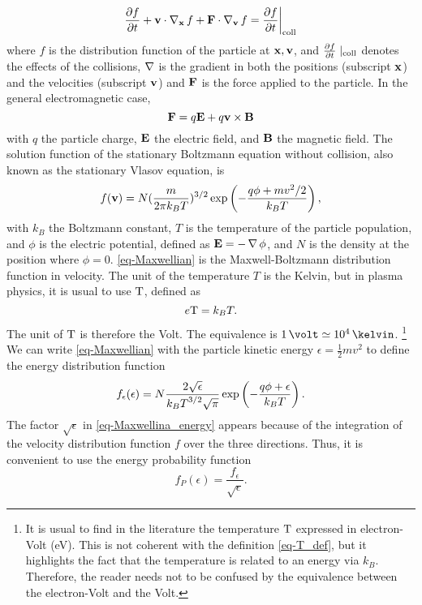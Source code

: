 \begin{equation} \label{eq-boltzmann}
\frac{\partial f}{\partial t}  + {\mathbf v} \cdot \operatorname{{\mathbf \nabla}}_{{\mathbf x}} f + {\mathbf F} \cdot  \operatorname{{\mathbf \nabla}}_{{\mathbf v}} f = \frac{\partial f}{\partial t}  \bigg\vert_{\rm coll} 
\end{equation}
where $f$ is the distribution function of the particle at ${\mathbf x}, {\mathbf v}$, and $\frac{\partial f}{\partial t}\mid_{\rm coll}$ denotes the effects of the collisions, $\operatorname{{\mathbf \nabla}}$ is the gradient in both the positions (subscript ${\mathbf x}$) and the velocities (subscript ${\mathbf v}$)  and ${\mathbf F}$ is the force applied to the particle.
In the general electromagnetic case,
\begin{equation*} \label{eq-forceEM}
  {\mathbf F} =  q {\mathbf E} + q {\mathbf v} \times {\mathbf B}
\end{equation*}
with $q$ the particle charge, ${\mathbf E}$ the electric field, and ${\mathbf B}$ the magnetic field.
The solution function of the stationary Boltzmann equation without collision, also known as the stationary Vlasov equation, is
\begin{equation} \label{eq-Maxwellian}
  f({\mathbf v}) = N (\frac{m}{2 \pi k_B T})^{3/2} \exp \left( - \frac{q \phi + m v^2/2}{k_B T } \right),
\end{equation}
with $k_B$ the Boltzmann constant, $T$ is the temperature of the particle population, and $\phi$ is the electric potential, defined as ${\mathbf E} = -\operatorname{{\mathbf \nabla}} \phi$, and $N$ is the density at the position where $\phi = 0$.
\cref{eq-Maxwellian} is the Maxwell-Boltzmann distribution function in velocity.
The unit of the temperature $T$ is the Kelvin, but in plasma physics, it is usual to use ${\rm T}$, defined as
\begin{equation} \label{eq-T_def}
  e {\rm T} = k_B T.
\end{equation}
The unit of ${\rm T}$ is therefore the Volt.
The equivalence is $1 \,\volt \simeq 10^4 \,\kelvin$.
\footnote{It is usual to find in the literature the temperature ${\rm T}$ expressed in electron-Volt (eV).
This is not coherent with the definition \cref{eq-T_def}, but it highlights the fact that the temperature is related to an energy via $k_B$. Therefore, the reader needs not to be confused by the equivalence between the electron-Volt and the Volt.  }
We can write \cref{eq-Maxwellian} with the particle kinetic energy $\epsilon = \frac{1}{2} m v^2$ to define the energy distribution function
\begin{equation} \label{eq-Maxwellina_energy}
  f_{\epsilon}(\epsilon) = N \frac{2 \sqrt{\epsilon}}{{k_B T}^{3/2} \sqrt{\pi}} \exp \left(- \frac{q \phi + \epsilon}{k_B T} \right).
\end{equation}
The factor $\sqrt{\epsilon}$ in \cref{eq-Maxwellina_energy} appears because of the integration of the velocity distribution function $f$ over the three directions.
Thus, it is convenient to use the energy probability function 
\begin{equation} \label{eq-EPF}
  f_P(\epsilon) = \frac{f_{\epsilon}}{\sqrt{\epsilon}}.
\end{equation}

